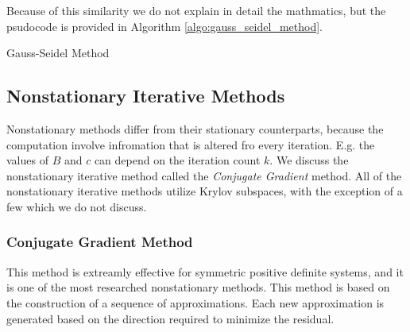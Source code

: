 \documentclass[../fem.tex]{subfiles}
\begin{document}
\begin{Figure}
   \begin{center}
     
   \end{center}
   \label{fig:gs_err}
\end{Figure}

Because of this similarity we do not explain in detail the mathmatics, but the
psudocode is provided in Algorithm \ref{algo:gauss_seidel_method}.

\begin{algorithm}[H]
  \caption{Gauss-Seidel Method}\label{algo:gauss_seidel_method}
  \begin{algorithmic}
    \EndFor
    \EndFor
    \EndIf
    \EndFor
  \end{algorithmic}
\end{algorithm}

\subsection{Nonstationary Iterative Methods}%
\label{sub:nonstationary_iterative_methods}

Nonstationary methods differ from their stationary counterparts, because the
computation involve infromation that is altered fro every iteration. E.g. the
values of $B$ and $c$ can depend on the iteration count $k$. We discuss the
nonstationary iterative method called the  \textit{Conjugate Gradient} method.
All of the nonstationary iterative methods utilize Krylov subspaces, with the
exception of a few which we do not discuss.

\subsubsection{Conjugate Gradient Method}%
\label{ssub:conjugate_gradient_method}

This method is extreamly effective for symmetric positive definite systems, and
it is one of the most researched nonstationary methods. This method is based on
the construction of a sequence of approximations. Each new approximation is
generated based on the direction required to minimize the residual.
\end{document}
